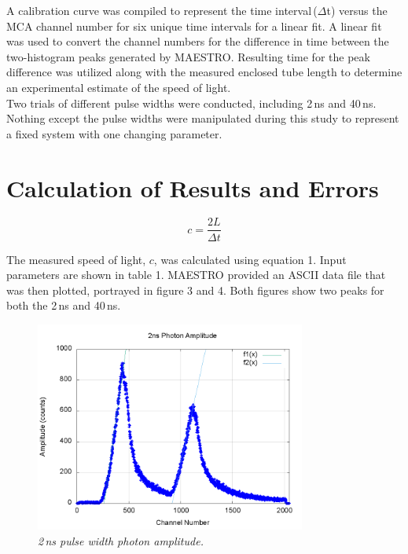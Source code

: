 \documentclass[aps,prl,twocolumn,superscriptaddress]{revtex4-1}
\begin{document}
A calibration curve was compiled to represent the time interval\,($\Delta$t) versus the MCA channel number for six unique time intervals for a linear fit. A linear fit was used to convert the channel numbers for the difference in time between the two-histogram peaks generated by MAESTRO. Resulting time for the peak difference was utilized along with the measured enclosed tube length to determine an experimental estimate of the speed of light.
\\
\indent Two trials of different pulse widths were conducted, including 2\,ns and 40\,ns. Nothing except the pulse widths were manipulated during this study to represent a fixed system with one changing parameter.





\section{Calculation of Results and Errors}

\begin{equation}
c = \frac{2L}{\Delta t}
\end{equation}

The measured speed of light, $c$, was calculated using equation 1. Input parameters are shown in table 1. MAESTRO provided an ASCII data file that was then plotted, portrayed in figure 3 and 4. Both figures show two peaks for both the 2\,ns and 40\,ns.

\begin{figure}[h!]
  \begin{center}
\centerline{\includegraphics[width=3.5in]{solgraph2.png}}
\caption{\it \small{2\,ns pulse width photon amplitude. \label{fig1}}}
  \end{center}
\end{figure}
\end{document}
